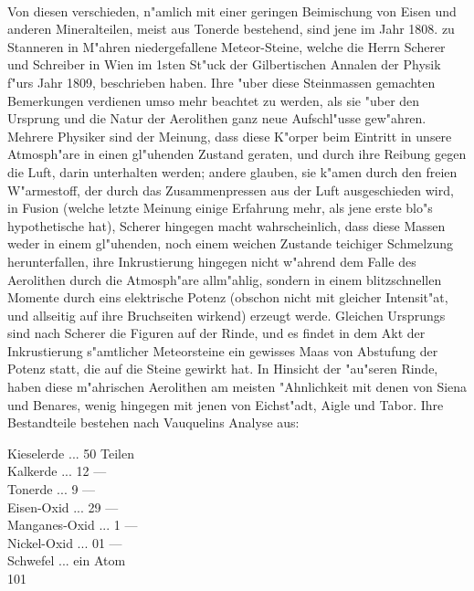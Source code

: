 \documentclass[a4paper, 11pt, oneside, polutonikogreek, german]{article}
\begin{document}
\paragraph{}
Von diesen verschieden, n"amlich mit einer geringen Beimischung von Eisen und anderen Mineralteilen, meist aus Tonerde bestehend, sind jene im Jahr 1808. zu Stanneren in M"ahren niedergefallene Meteor-Steine, welche die Herrn Scherer und Schreiber in Wien im 1sten St"uck der Gilbertischen Annalen der Physik f"urs Jahr 1809, beschrieben haben. Ihre "uber diese Steinmassen gemachten Bemerkungen verdienen umso mehr beachtet zu werden, als sie "uber den Ursprung und die Natur der Aerolithen ganz neue Aufschl"usse gew"ahren. Mehrere Physiker sind der Meinung, dass diese K"orper beim Eintritt in unsere Atmosph"are in einen gl"uhenden Zustand geraten, und durch ihre Reibung gegen die Luft, darin unterhalten werden; andere glauben, sie k"amen durch den freien W"armestoff, der durch das Zusammenpressen aus der Luft ausgeschieden wird, in Fusion (welche letzte Meinung einige Erfahrung mehr, als jene erste blo"s hypothetische hat), Scherer hingegen macht wahrscheinlich, dass diese Massen weder in einem gl"uhenden, noch einem weichen Zustande teichiger Schmelzung herunterfallen, ihre Inkrustierung hingegen nicht w"ahrend dem Falle des Aerolithen durch die Atmosph"are allm"ahlig, sondern in einem blitzschnellen Momente durch eins elektrische Potenz (obschon nicht mit gleicher Intensit"at, und allseitig auf ihre Bruchseiten wirkend) erzeugt werde. Gleichen Ursprungs sind nach Scherer die Figuren auf der Rinde, und es findet in dem Akt der Inkrustierung s"amtlicher Meteorsteine ein gewisses Maas von Abstufung der Potenz statt, die auf die Steine gewirkt hat. In Hinsicht der "au"seren Rinde, haben diese m"ahrischen Aerolithen am meisten "Ahnlichkeit mit denen von Siena und Benares, wenig hingegen mit jenen von Eichst"adt, Aigle und Tabor. Ihre Bestandteile bestehen nach Vauquelins Analyse aus:

Kieselerde ... 50 Teilen\\
\hspace*{0.5cm} Kalkerde ... 12 ---\\
\hspace*{0.5cm} Tonerde ... 9 ---\\
\hspace*{0.5cm} Eisen-Oxid ... 29 ---\\
\hspace*{0.5cm} Manganes-Oxid ... 1 ---\\
\hspace*{0.5cm} Nickel-Oxid ... 01 ---\\
\hspace*{0.5cm} Schwefel ... ein Atom\\
\hspace*{2.5cm} 101
\end{document}
